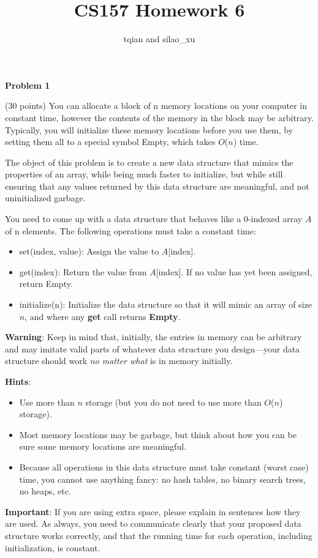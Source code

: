 \documentclass{letter}
\newcommand{\emdash}{---}
\newcommand{\section}[1]{\medskip\bigskip

\noindent\textbf{\LARGE #1}}
\newcommand{\tmem}[1]{{\em #1\/}}
\newcommand{\tmstrong}[1]{\textbf{#1}}
\newenvironment{itemizedot}{\begin{itemize} \renewcommand{\labelitemi}{$\bullet$}\renewcommand{\labelitemii}{$\bullet$}\renewcommand{\labelitemiii}{$\bullet$}\renewcommand{\labelitemiv}{$\bullet$}}{\end{itemize}}
\begin{document}
\title{CS157 Homework 6}\author{tqian and silao\_xu\\
}\maketitle

\section{Problem 1}

(30 points) You can allocate a block of n memory locations on your computer in
constant time, however the contents of the memory in the block may be
arbitrary. Typically, you will initialize these memory locations before you
use them, by setting them all to a special symbol Empty, which takes $O$($n$)
time.

The object of this problem is to create a new data structure that mimics the
properties of an array, while being much faster to initialize, but while still
ensuring that any values returned by this data structure are meaningful, and
not uninitialized garbage.

You need to come up with a data structure that behaves like a 0-indexed array
$A$ of n elements. The following operations must take a constant time:
\begin{itemizedot}
  \item set(index, value): Assign the value to $A$[index].
  
  \item get(index): Return the value from $A$[index]. If no value has yet been
  assigned, return Empty.
  
  \item initialize(n): Initialize the data structure so that it will mimic an
  array of size $n$, and where any {\tmstrong{get}} call returns
  {\tmstrong{Empty}}.
\end{itemizedot}
{\tmstrong{Warning}}: Keep in mind that, initially, the entries in memory can
be arbitrary and may imitate valid parts of whatever data structure you
design{\emdash}your data structure should work {\tmem{no matter what}} is in
memory initially.

{\tmstrong{Hints}}:
\begin{itemizedot}
  \item Use more than $n$ storage (but you do not need to use more than
  $O$($n$) storage).
  
  \item Most memory locations may be garbage, but think about how you can be
  sure some memory locations are meaningful.
  
  \item Because all operations in this data structure must take constant
  (worst case) time, you cannot use anything fancy: no hash tables, no binary
  search trees, no heaps, etc.
\end{itemizedot}
{\tmstrong{Important}}: If you are using extra space, please explain in
sentences how they are used. As always, you need to communicate clearly that
your proposed data structure works correctly, and that the running time for
each operation, including initialization, is constant.{\tmem{{\tmstrong{}}}}
\end{document}
